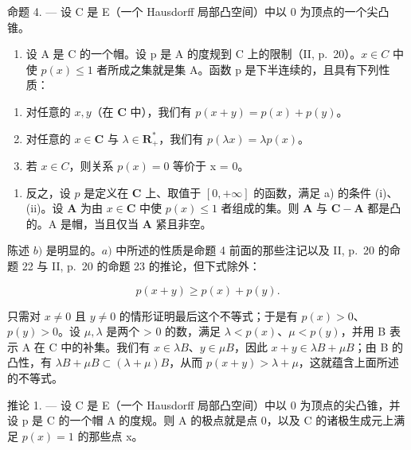 命题 4. --- 设 C 是 E（一个 Hausdorff 局部凸空间）中以 0 为顶点的一个尖凸锥。

\begin{enumerate}
\def\labelenumi{\alph{enumi})}
\tightlist
\item
  设 A 是 C 的一个帽。设 p 是 A 的度规到 C 上的限制（II, p.~20）。\(x \in C\) 中使 \(p(x) \leqslant 1\) 者所成之集就是集 A。函数 p 是下半连续的，且具有下列性质：
\end{enumerate}

\begin{enumerate}
\def\labelenumi{(\roman{enumi})}
\item
  对任意的 \(x, y\)（在 \(\mathbf{C}\) 中），我们有 \(p(x + y) = p(x) + p(y)\)。
\item
  对任意的 \(x \in \mathbf{C}\) 与 \(\lambda \in \mathbf{R}_{+}^{*}\)，我们有 \(p(\lambda x) = \lambda p(x)\)。
\item
  若 \(x \in C\)，则关系 \(p(x) = 0\) 等价于 x = 0。
\end{enumerate}

\begin{enumerate}
\def\labelenumi{\alph{enumi})}
\setcounter{enumi}{1}
\tightlist
\item
  反之，设 \(p\) 是定义在 \(\mathbf{C}\) 上、取值于 \([0, +\infty]\) 的函数，满足 a) 的条件 (i)、(ii)。设 \(\mathbf{A}\) 为由 \(x \in \mathbf{C}\) 中使 \(p(x) \leqslant 1\) 者组成的集。则 \(\mathbf{A}\) 与 \(\mathbf{C} - \mathbf{A}\) 都是凸的。A 是帽，当且仅当 \(\mathbf{A}\) 紧且非空。
\end{enumerate}

陈述 \(b)\) 是明显的。\(a)\) 中所述的性质是命题 4 前面的那些注记以及 II, p.~20 的命题 22 与 II, p.~20 的命题 23 的推论，但下式除外：

\[
p (x + y) \geqslant p (x) + p (y).
\]

只需对 \(x \neq 0\) 且 \(y \neq 0\) 的情形证明最后这个不等式；于是有 \(p(x) > 0\)、\(p(y) > 0\)。设 \(\mu, \lambda\) 是两个 \textgreater{} 0 的数，满足 \(\lambda < p(x)\)、\(\mu < p(y)\)，并用 B 表示 A 在 C 中的补集。我们有 \(x \in \lambda B\)、\(y \in \mu B\)，因此 \(x + y \in \lambda B + \mu B\)；由 B 的凸性，有 \(\lambda B + \mu B \subset (\lambda + \mu)B\)，从而 \(p(x + y) > \lambda + \mu\)，这就蕴含上面所述的不等式。

推论 1. --- 设 C 是 E（一个 Hausdorff 局部凸空间）中以 0 为顶点的尖凸锥，并设 p 是 C 的一个帽 A 的度规。则 A 的极点就是点 0，以及 C 的诸极生成元上满足 \(p(x) = 1\) 的那些点 x。

